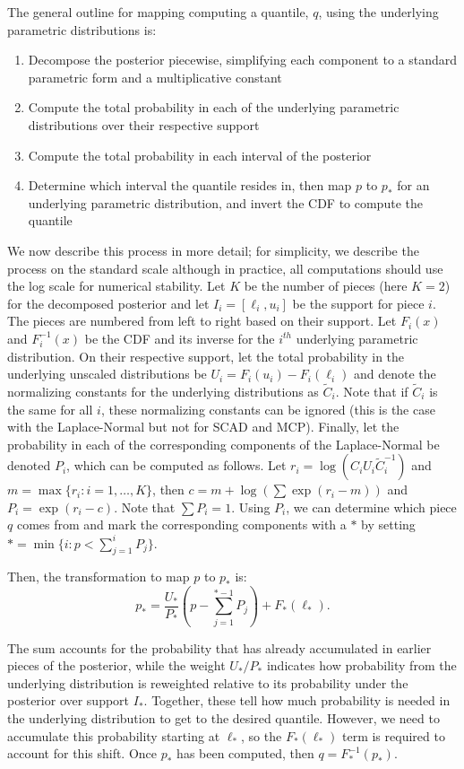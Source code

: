 The general outline for mapping computing a quantile, $q$, using the underlying parametric distributions is:
\begin{enumerate}
  \item Decompose the posterior piecewise, simplifying each component to a standard parametric form and a multiplicative constant
  \item Compute the total probability in each of the underlying parametric distributions over their respective support
  \item Compute the total probability in each interval of the posterior
  \item Determine which interval the quantile resides in, then map $p$ to $p_*$ for an underlying parametric distribution, and invert the CDF to compute the quantile
\end{enumerate}

We now describe this process in more detail; for simplicity, we describe the process on the standard scale although in practice, all computations should use the log scale for numerical stability. Let $K$ be the number of pieces (here $K = 2$) for the decomposed posterior and let $I_i=[\ell_i,u_i]$ be the support for piece $i$. The pieces are numbered from left to right based on their support. Let $F_i(x)$ and $F_i^{-1}(x)$ be the CDF and its inverse for the $i^{th}$ underlying parametric distribution. On their respective support, let the total probability in the underlying unscaled distributions be $U_i = F_i(u_i) - F_i(\ell_i)$ and denote the normalizing constants for the underlying distributions as $\tilde{C}_i$. Note that if $\tilde{C}_i$ is the same for all $i$, these normalizing constants can be ignored (this is the case with the Laplace-Normal but not for SCAD and MCP). Finally, let the probability in each of the corresponding components of the Laplace-Normal be denoted $P_i$, which can be computed as follows. Let $r_i = \log(C_iU_i\tilde{C}_i^{-1})$ and $m = \max\{r_i: i = 1, \ldots, K\}$, then $c = m + \log(\sum\exp(r_i - m))$ and $P_i = \exp(r_i - c)$. Note that $\sum P_i = 1$. Using $P_i$, we can determine which piece $q$ comes from and mark the corresponding components with a $*$ by setting $* = \min\{i : p < \sum_{j=1}^i P_j\}$.

Then, the transformation to map $p$ to $p_*$ is: 
$$
p_* = \frac{U_{*}}{P_{*}} (p - \sum_{j = 1}^{{*} - 1} P_j) + F_{*}(\ell_*).
$$

The sum accounts for the probability that has already accumulated in earlier pieces of the posterior, while the weight $U_{*} / P_{*}$ indicates how probability from the underlying distribution is reweighted relative to its probability under the posterior over support $I_*$. Together, these tell how much probability is needed in the underlying distribution to get to the desired quantile. However, we need to accumulate this probability starting at $\ell_{*}$, so the $F_{*}(\ell_*)$ term is required to account for this shift. Once $p_*$ has been computed, then $q = F_*^{-1}(p_*)$.

